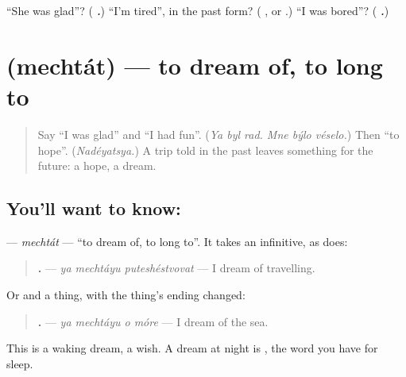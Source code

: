 \begin{tcolorbox}[breakable,colback=teal!4,colframe=teal!35!black,title={Before you move on}]
\textquotedblleft{}She was glad\textquotedblright{}? (\emph{\textbf{  .}}) \textquotedblleft{}I'm tired\textquotedblright{}, in the past form? (\emph{\textbf{ }}, or \emph{\textbf{ }}.) \textquotedblleft{}I was bored\textquotedblright{}? (\emph{\textbf{  .}})
\end{tcolorbox}
\section[\texorpdfstring{\ru{мечтать} (mechtát)}{мечтать (mechtát)}]{ (mechtát) — to dream of, to long to}

\label{lesson:RU-C267-mechtat}



\begin{quote}
Say \textquotedblleft{}I was glad\textquotedblright{} and \textquotedblleft{}I had fun\textquotedblright{}. (\emph{Ya byl rad. Mne býlo véselo.}) Then \textquotedblleft{}to hope\textquotedblright{}. (\emph{Nadéyatsya.}) A trip told in the past leaves something for the future: a hope, a dream.
\end{quote}

\subsection*{You'll want to know: }
\textbf{} — \emph{mechtát} — \textquotedblleft{}to dream of, to long to\textquotedblright{}. It takes an infinitive, as \emph{} does:

\begin{quote}
\textbf{  .} — \emph{ya mechtáyu puteshéstvovat} — I dream of travelling.
\end{quote}

Or \textbf{} and a thing, with the thing's ending changed:

\begin{quote}
\textbf{   .} — \emph{ya mechtáyu o móre} — I dream of the sea.
\end{quote}

This is a waking dream, a wish. A dream at night is \textbf{}, the word you have for sleep.

